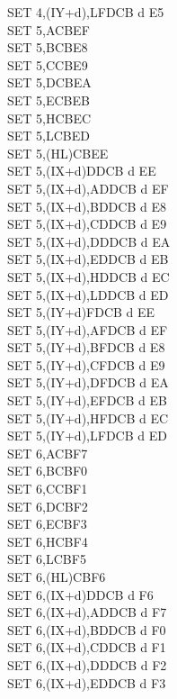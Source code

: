 \begin{multicols}{3}
{\begin{tabbing}
		SET 4,(IY+d),L\UNDOC\>FDCB d E5\\
		SET 5,A\>CBEF\\
		SET 5,B\>CBE8\\
		SET 5,C\>CBE9\\
		SET 5,D\>CBEA\\
		SET 5,E\>CBEB\\
		SET 5,H\>CBEC\\
		SET 5,L\>CBED\\
		SET 5,(HL)\>CBEE\\
		SET 5,(IX+d)\>DDCB d EE\\
		SET 5,(IX+d),A\UNDOC\>DDCB d EF\\
		SET 5,(IX+d),B\UNDOC\>DDCB d E8\\
		SET 5,(IX+d),C\UNDOC\>DDCB d E9\\
		SET 5,(IX+d),D\UNDOC\>DDCB d EA\\
		SET 5,(IX+d),E\UNDOC\>DDCB d EB\\
		SET 5,(IX+d),H\UNDOC\>DDCB d EC\\
		SET 5,(IX+d),L\UNDOC\>DDCB d ED\\
		SET 5,(IY+d)\>FDCB d EE\\
		SET 5,(IY+d),A\UNDOC\>FDCB d EF\\
		SET 5,(IY+d),B\UNDOC\>FDCB d E8\\
		SET 5,(IY+d),C\UNDOC\>FDCB d E9\\
		SET 5,(IY+d),D\UNDOC\>FDCB d EA\\
		SET 5,(IY+d),E\UNDOC\>FDCB d EB\\
		SET 5,(IY+d),H\UNDOC\>FDCB d EC\\
		SET 5,(IY+d),L\UNDOC\>FDCB d ED\\
		SET 6,A\>CBF7\\
		SET 6,B\>CBF0\\
		SET 6,C\>CBF1\\
		SET 6,D\>CBF2\\
		SET 6,E\>CBF3\\
		SET 6,H\>CBF4\\
		SET 6,L\>CBF5\\
		SET 6,(HL)\>CBF6\\
		SET 6,(IX+d)\>DDCB d F6\\
		SET 6,(IX+d),A\UNDOC\>DDCB d F7\\
		SET 6,(IX+d),B\UNDOC\>DDCB d F0\\
		SET 6,(IX+d),C\UNDOC\>DDCB d F1\\
		SET 6,(IX+d),D\UNDOC\>DDCB d F2\\
		SET 6,(IX+d),E\UNDOC\>DDCB d F3\\

\end{tabbing}}
\end{multicols}
